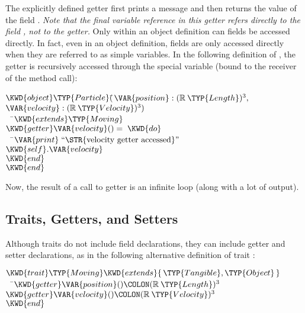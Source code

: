 The explicitly defined getter first prints a message and then returns
the value of the
field . \emph{Note that the final variable reference in this getter refers
directly to the field , not to the getter.} Only within an object definition
can fields be accessed directly. In fact, even in an object definition, fields are only
accessed directly when they are referred to as simple variables. In the following definition
of , the getter  is recursively accessed through the special variable
 (bound to the receiver of the method call):

\begin{Fortress}
\(\KWD{object} \TYP{Particle}(\null\)\pushtabs\=\+\(\VAR{position} \mathrel{\mathtt{:}} (\mathbb{R}\mskip 4mu plus 4mu\TYP{Length})^{3},\)\\
\(                \VAR{velocity} \mathrel{\mathtt{:}} (\mathbb{R}\mskip 4mu plus 4mu\TYP{Velocity})^{3})\)\-\\\poptabs
{\tt~~}\pushtabs\=\+\(  \KWD{extends} \TYP{Moving}\)\\
\(  \KWD{getter} \VAR{velocity}() = \;\KWD{do}\)\\
{\tt~~}\pushtabs\=\+\(    \VAR{print}\;\hbox{\rm``\STR{velocity~getter~accessed}''}\)\\
\(    \mathord{\KWD{self}}.\VAR{velocity}\)\-\\\poptabs
\(  \KWD{end}\)\-\\\poptabs
\(\KWD{end}\)
\end{Fortress}

Now, the result of a call to getter  is an infinite loop (along with a lot of output).

\subsection{Traits, Getters, and Setters}
Although traits do not include field declarations, they can include getter and setter declarations, as in the following
alternative definition of trait :

\begin{Fortress}
\(\KWD{trait} \TYP{Moving} \KWD{extends} \{\,\TYP{Tangible}, \TYP{Object}\,\}\)\\
{\tt~~}\pushtabs\=\+\(  \KWD{getter} \VAR{position}()\COLON (\mathbb{R}\mskip 4mu plus 4mu\TYP{Length})^{3}\)\\
\(  \KWD{getter} \VAR{velocity}()\COLON (\mathbb{R}\mskip 4mu plus 4mu\TYP{Velocity})^{3}\)\-\\\poptabs
\(\KWD{end}\)
\end{Fortress}

